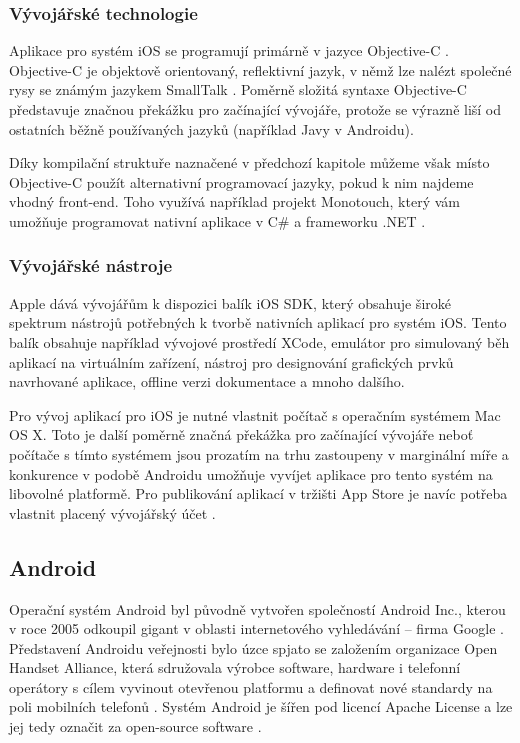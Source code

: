 \subsubsection{Vývojářské technologie}
Aplikace pro systém iOS se programují primárně v jazyce Objective-C \cite{introduction_ios_development}. Objective-C je objektově orientovaný, reflektivní jazyk, v němž lze nalézt společné rysy se známým jazykem SmallTalk \cite{bp_dominik}. Poměrně složitá syntaxe Objective-C představuje značnou překážku pro začínající vývojáře, protože se výrazně liší od ostatních běžně používaných jazyků (například Javy v Androidu).

Díky kompilační struktuře naznačené v předchozí kapitole můžeme však místo Objective-C použít alternativní programovací jazyky, pokud k nim najdeme vhodný front-end. Toho využívá například projekt Monotouch, který vám umožňuje programovat nativní aplikace v C\# a frameworku .NET \cite{xamarin_monotouch}.

\subsubsection{Vývojářské nástroje}
Apple dává vývojářům k dispozici balík iOS SDK, který obsahuje široké spektrum nástrojů potřebných k tvorbě nativních aplikací pro systém iOS. Tento balík obsahuje například vývojové prostředí XCode, emulátor pro simulovaný běh aplikací na virtuálním zařízení, nástroj pro designování grafických prvků navrhované aplikace, offline verzi dokumentace a mnoho dalšího.

Pro vývoj aplikací pro iOS je nutné vlastnit počítač s operačním systémem Mac OS X. Toto je další poměrně značná překážka pro začínající vývojáře neboť počítače s tímto systémem jsou prozatím na trhu zastoupeny v marginální míře a konkurence v podobě Androidu umožňuje vyvíjet aplikace pro tento systém na libovolné platformě.  Pro publikování aplikací v tržišti App Store je navíc potřeba vlastnit placený vývojářský účet \cite{distribute_ios_app}.

\subsection{Android}
Operační systém Android byl původně vytvořen společností Android Inc., kterou v roce 2005 odkoupil gigant v oblasti internetového vyhledávání – firma Google \cite{google_buys_android}. Představení Androidu veřejnosti bylo úzce spjato se založením organizace Open Handset Alliance, která sdružovala výrobce software, hardware i telefonní operátory s cílem vyvinout otevřenou platformu a definovat nové standardy na poli mobilních telefonů \cite{android_announce}. Systém Android je šířen pod licencí Apache License a lze jej tedy označit za open-source software \cite{android_overview}.

